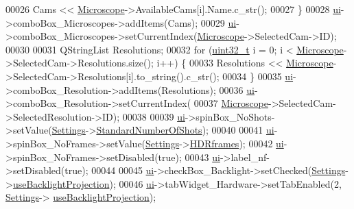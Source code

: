 \begin{DoxyCode}
00026     Cams << \hyperlink{class_microscope}{Microscope}->AvailableCams[i].Name.c\_str();
00027   \}
00028   \hyperlink{class_dialog_settings_a5b53d91a27cdf68f77e4bdd10b6a9bba}{ui}->comboBox\_Microscopes->addItems(Cams);
00029   \hyperlink{class_dialog_settings_a5b53d91a27cdf68f77e4bdd10b6a9bba}{ui}->comboBox\_Microscopes->setCurrentIndex(\hyperlink{class_microscope}{Microscope}->SelectedCam->ID);
00030 
00031   QStringList Resolutions;
00032   \textcolor{keywordflow}{for} (\hyperlink{_soil_math_types_8h_a435d1572bf3f880d55459d9805097f62}{uint32\_t} i = 0; i < \hyperlink{class_microscope}{Microscope}->SelectedCam->Resolutions.size(); i++) \{
00033     Resolutions << \hyperlink{class_microscope}{Microscope}->SelectedCam->Resolutions[i].to\_string().c\_str();
00034   \}
00035   \hyperlink{class_dialog_settings_a5b53d91a27cdf68f77e4bdd10b6a9bba}{ui}->comboBox\_Resolution->addItems(Resolutions);
00036   \hyperlink{class_dialog_settings_a5b53d91a27cdf68f77e4bdd10b6a9bba}{ui}->comboBox\_Resolution->setCurrentIndex(
00037       \hyperlink{class_microscope}{Microscope}->SelectedCam->SelectedResolution->ID);
00038 
00039   \hyperlink{class_dialog_settings_a5b53d91a27cdf68f77e4bdd10b6a9bba}{ui}->spinBox\_NoShots->setValue(\hyperlink{class_dialog_settings_ae6b9e42f9108f93c4964be28a7171648}{Settings}->\hyperlink{class_soil_analyzer_1_1_soil_settings_a290567ffd8fe54f1c800654395ca7a71}{StandardNumberOfShots});
00040 
00041   \hyperlink{class_dialog_settings_a5b53d91a27cdf68f77e4bdd10b6a9bba}{ui}->spinBox\_NoFrames->setValue(\hyperlink{class_dialog_settings_ae6b9e42f9108f93c4964be28a7171648}{Settings}->\hyperlink{class_soil_analyzer_1_1_soil_settings_a77e631ff44efe74762b5adaa2eb2cd11}{HDRframes});
00042   \hyperlink{class_dialog_settings_a5b53d91a27cdf68f77e4bdd10b6a9bba}{ui}->spinBox\_NoFrames->setDisabled(\textcolor{keyword}{true});
00043   \hyperlink{class_dialog_settings_a5b53d91a27cdf68f77e4bdd10b6a9bba}{ui}->label\_nf->setDisabled(\textcolor{keyword}{true});
00044 
00045   \hyperlink{class_dialog_settings_a5b53d91a27cdf68f77e4bdd10b6a9bba}{ui}->checkBox\_Backlight->setChecked(\hyperlink{class_dialog_settings_ae6b9e42f9108f93c4964be28a7171648}{Settings}->\hyperlink{class_soil_analyzer_1_1_soil_settings_a4945fc8b592a2585d3719175e3b80c88}{useBacklightProjection});
00046   \hyperlink{class_dialog_settings_a5b53d91a27cdf68f77e4bdd10b6a9bba}{ui}->tabWidget\_Hardware->setTabEnabled(2, \hyperlink{class_dialog_settings_ae6b9e42f9108f93c4964be28a7171648}{Settings}->
      \hyperlink{class_soil_analyzer_1_1_soil_settings_a4945fc8b592a2585d3719175e3b80c88}{useBacklightProjection});

\end{DoxyCode}
